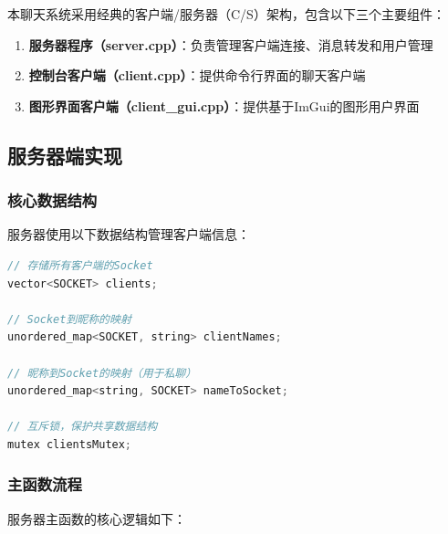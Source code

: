 \documentclass[12pt, a4paper]{article}
\begin{document}
本聊天系统采用经典的客户端/服务器（C/S）架构，包含以下三个主要组件：

\begin{enumerate}[itemsep=3pt]
  \item \textbf{服务器程序（server.cpp）}：负责管理客户端连接、消息转发和用户管理
  \item \textbf{控制台客户端（client.cpp）}：提供命令行界面的聊天客户端
  \item \textbf{图形界面客户端（client\_gui.cpp）}：提供基于ImGui的图形用户界面
\end{enumerate}

\subsection{服务器端实现}

\subsubsection{核心数据结构}

服务器使用以下数据结构管理客户端信息：

\begin{lstlisting}[language=c++]
// 存储所有客户端的Socket
vector<SOCKET> clients;

// Socket到昵称的映射
unordered_map<SOCKET, string> clientNames;

// 昵称到Socket的映射（用于私聊）
unordered_map<string, SOCKET> nameToSocket;

// 互斥锁，保护共享数据结构
mutex clientsMutex;
\end{lstlisting}

\subsubsection{主函数流程}

服务器主函数的核心逻辑如下：
\end{document}
